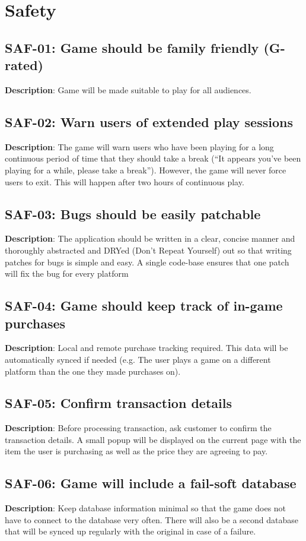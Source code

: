 \section{Safety}
\subsection{SAF-01: Game should be family friendly (G-rated)}
\textbf{Description}: Game will be made suitable to play for all audiences.
\subsection{SAF-02: Warn users of extended play sessions}
\textbf{Description}: The game will warn users who have been playing for a
long continuous period of time that they should take a break (\textquotedblleft{}It
appears you\textquoteright{}ve been playing for a while, please take
a break\textquotedblright{}). However, the game will never force users
to exit. This will happen after two hours of continuous play.
\subsection{SAF-03: Bugs should be easily patchable}
\textbf{Description}: The application should be written in a clear, concise
manner and thoroughly abstracted and DRYed (Don\textquoteright{}t
Repeat Yourself) out so that writing patches for bugs is simple and
easy. A single code-base ensures that one patch will fix the bug for
every platform
\subsection{SAF-04: Game should keep track of in-game purchases}
\textbf{Description}: Local and remote purchase tracking required. This data
will be automatically synced if needed (e.g. The user plays a game
on a different platform than the one they made purchases on). 
\subsection{SAF-05: Confirm transaction details}
\textbf{Description}: Before processing transaction, ask customer to confirm
the transaction details. A small popup will be displayed on the current
page with the item the user is purchasing as well as the price they
are agreeing to pay.
\subsection{SAF-06: Game will include a fail-soft database}
\textbf{Description}: Keep database information minimal so that the game does
not have to connect to the database very often. There will also be
a second database that will be synced up regularly with the original
in case of a failure.
